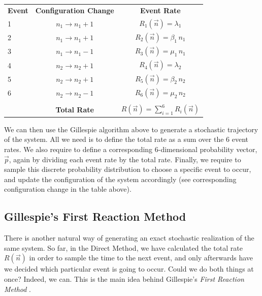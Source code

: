 \begin{center}
	\begin{tabular}{lcc}
		\textbf{Event} & \textbf{Configuration Change} & \textbf{Event Rate}                                                               \\
		
		1      & $n_1 \rightarrow n_1 + 1$ & $R_1(\vec{n}) = \lambda_1$              \\
		2      & $n_1 \rightarrow n_1 + 1$ & $R_2(\vec{n}) = \beta_1\,n_1$           \\
		3      & $n_1 \rightarrow n_1 - 1$ & $R_3(\vec{n}) = \mu_1\,n_1$             \\
		4      & $n_2 \rightarrow n_2 + 1$ & $R_4(\vec{n}) = \lambda_2$              \\
		5      & $n_2 \rightarrow n_2 + 1$ & $R_5(\vec{n}) = \beta_2\,n_2$           \\
		6      & $n_2 \rightarrow n_2 - 1$ & $R_6(\vec{n}) = \mu_2\,n_2$             \\
		       &                           &                                         \\
		       & \textbf{Total Rate}       & $R(\vec{n}) = \sum_{i=1}^6 R_i(\vec{n})$
	\end{tabular}
\end{center}
We can then use the Gillespie algorithm above to generate a stochastic trajectory of the system. All we need is to define the total rate as a sum over the 6 event rates. We also require to define a corresponding 6-dimensional probability vector, $\vec{p}$, again by dividing each event rate by the total rate. Finally, we require to sample this discrete probability distribution to choose a specific event to occur, and update the configuration of the system accordingly (see corresponding configuration change in the table above).  
\smallskip

\subsection{Gillespie's First Reaction Method}
There is another natural way of generating an exact stochastic realization of the same system. So far, in the Direct Method, we have calculated the total rate $R(\vec n)$ in order to sample the time to the next event, and only afterwards have we decided which particular event is going to occur. Could we do both things at once? Indeed, we can. This is the main idea behind Gillespie's \emph{First Reaction Method} \citep{Gillespie76}.
\smallskip

